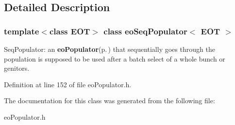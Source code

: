 \subsection{Detailed Description}
\subsubsection*{template$<$class EOT$>$ class eo\-Seq\-Populator$<$ EOT $>$}

Seq\-Populator: an {\bf eo\-Populator}{\rm (p.\,\pageref{classeo_populator})} that sequentially goes through the population is supposed to be used after a batch select of a whole bunch or genitors. 



Definition at line 152 of file eo\-Populator.h.

The documentation for this class was generated from the following file:\begin{CompactItemize}
\item 
eo\-Populator.h\end{CompactItemize}
